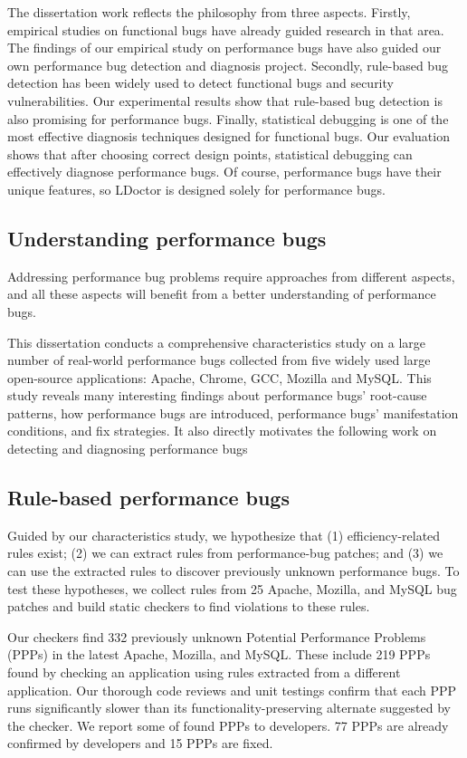 The dissertation work reflects the philosophy from three aspects. 
Firstly, empirical studies on functional bugs have already guided research in that area. 
The findings of our empirical study on performance bugs have also guided our own performance bug detection and diagnosis project. 
Secondly, rule-based bug detection has been widely used to detect functional bugs and security vulnerabilities. 
Our experimental results show that rule-based bug detection is also promising for performance bugs. 
Finally, statistical debugging is one of the most effective diagnosis techniques designed for functional bugs. 
Our evaluation shows that after choosing correct design points, statistical debugging can effectively diagnose performance bugs. 
Of course, performance bugs have their unique features, 
so LDoctor is designed solely for performance bugs. 

\subsection{Understanding performance bugs}

Addressing performance bug problems require approaches from different aspects, 
and all these aspects will benefit from a better understanding of performance bugs. 

This dissertation conducts a comprehensive characteristics study on 
a large number of real-world performance bugs collected from five widely used large open-source applications: 
Apache, Chrome, GCC, Mozilla and MySQL. 
This study reveals many interesting findings about performance bugs' root-cause patterns, 
how performance bugs are introduced, performance bugs' manifestation conditions, and fix strategies. 
It also directly motivates the following work on detecting and diagnosing performance bugs

\subsection{Rule-based performance bugs}

Guided by our characteristics study, we hypothesize that 
(1) efficiency-related rules exist; 
(2) we can extract rules from performance-bug patches; 
and (3) we can use the extracted rules to discover previously unknown performance bugs. 
To test these hypotheses, we collect rules from 25 Apache, Mozilla, and MySQL bug patches 
and build static checkers to find violations to these rules.

Our checkers find 332 previously unknown Potential Performance Problems (PPPs) 
in the latest Apache, Mozilla, and MySQL. 
These include 219 PPPs found by checking an application using rules extracted from a different application. 
Our thorough code reviews and unit testings confirm that each PPP runs significantly slower 
than its functionality-preserving alternate suggested by the checker. 
We report some of found PPPs to developers. 77 PPPs are already confirmed by developers and 15 PPPs are fixed.  

